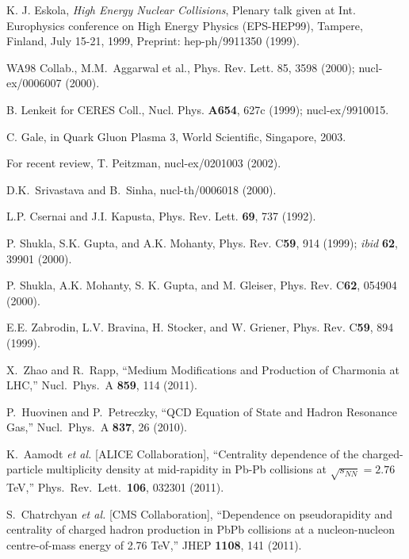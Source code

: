 \documentclass[aps,prc,preprint,superscriptaddress,showpacs,showkeys]{revtex4-1}
\begin{document}
\begin{thebibliography}{00}

 K. J. Eskola, {\it High Energy Nuclear Collisions}, 
  Plenary talk given at Int. Europhysics conference on High Energy Physics 
  (EPS-HEP99), Tampere, Finland, July 15-21, 1999, 
  Preprint: hep-ph/9911350 (1999).
  
 WA98 Collab., M.M.\ Aggarwal et al., 
            Phys. Rev. Lett. 85, 3598 (2000); nucl-ex/0006007 (2000).






 B. Lenkeit for CERES Coll., 
        Nucl. Phys. {\bf A654}, 627c (1999); nucl-ex/9910015.  
  
 C. Gale, in {Quark Gluon Plasma 3}, World Scientific,
         Singapore, 2003. 
         
 For recent review,  T. Peitzman, nucl-ex/0201003 (2002).

 D.K.\ Srivastava and B.\ Sinha, nucl-th/0006018 (2000).

 L.P. Csernai and J.I. Kapusta, Phys. Rev. Lett. {\bf 69},
               737 (1992).

 P. Shukla, S.K. Gupta, and A.K. Mohanty,
         Phys. Rev. C{\bf 59}, 914 (1999); {\it ibid} {\bf 62}, 39901 (2000).

 P. Shukla, A.K. Mohanty, S. K. Gupta, and M. Gleiser,
              Phys. Rev. C{\bf 62}, 054904 (2000).

 E.E. Zabrodin, L.V. Bravina, H. Stocker, and W. Griener,
         Phys. Rev. C{\bf 59}, 894 (1999).


  X.~Zhao and R.~Rapp,
  ``Medium Modifications and Production of Charmonia at LHC,''
  Nucl.\ Phys.\ A {\bf 859}, 114 (2011).

  P.~Huovinen and P.~Petreczky,
  ``QCD Equation of State and Hadron Resonance Gas,''
  Nucl.\ Phys.\ A {\bf 837}, 26 (2010).


  K.~Aamodt {\it et al.}  [ALICE Collaboration],
  ``Centrality dependence of the charged-particle multiplicity density at mid-rapidity in Pb-Pb collisions at $\sqrt{s_{NN}}=2.76$ TeV,''
  Phys.\ Rev.\ Lett.\  {\bf 106}, 032301 (2011).
  

  S.~Chatrchyan {\it et al.}  [CMS Collaboration],
  ``Dependence on pseudorapidity and centrality of charged hadron production in PbPb collisions at a nucleon-nucleon 
  centre-of-mass energy of 2.76 TeV,''
  JHEP {\bf 1108}, 141 (2011).


\end{thebibliography}
\end{document}
